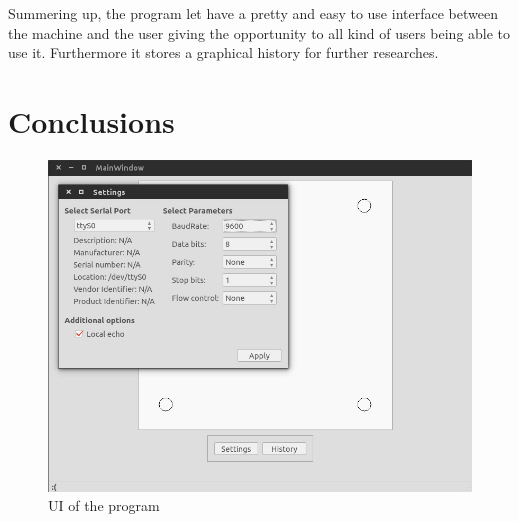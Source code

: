 		Summering up, the program let have a pretty and easy to use interface between the machine and the user giving the opportunity to all kind of users being able to use it. Furthermore it stores a graphical history for further researches.

	\section{Conclusions} %
	\label{sec:pc_conclusions}
	

		\begin{figure}[hb!]
			\begin{center}
				\includegraphics[width=.8\textwidth]{figures/UI}
			\end{center}
			\caption{UI of the program}
			\label{fig:ui}
		\end{figure}